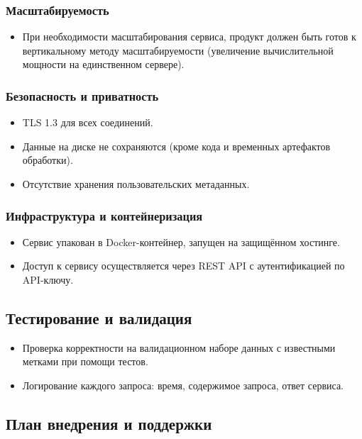 \documentclass[12pt]{article}
\begin{document}
\subsubsection{Масштабируемость}
\begin{itemize}
	\item При необходимости масштабирования сервиса, продукт должен быть готов к вертикальному методу масштабируемости (увеличение вычислительной мощности на единственном сервере).
\end{itemize}

\subsubsection{Безопасность и приватность}
\begin{itemize}
	\item TLS 1.3 для всех соединений.
	\item Данные на диске не сохраняются (кроме кода и временных артефактов обработки).
	\item Отсутствие хранения пользовательских метаданных.
\end{itemize}

\subsubsection{Инфраструктура и контейнеризация}
\begin{itemize}
	\item Сервис упакован в Docker-контейнер, запущен на защищённом хостинге.
	\item Доступ к сервису осуществляется через REST API с аутентификацией по API-ключу.
\end{itemize}

\subsection{Тестирование и валидация}
\begin{itemize}
	\item Проверка корректности на валидационном наборе данных с известными метками при помощи тестов.
	\item Логирование каждого запроса: время, содержимое запроса, ответ сервиса.
\end{itemize}

\subsection{План внедрения и поддержки}
\end{document}

